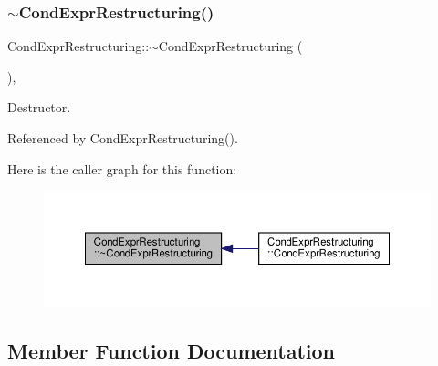 \subsubsection{\texorpdfstring{$\sim$\+Cond\+Expr\+Restructuring()}{~CondExprRestructuring()}}
{\footnotesize\ttfamily Cond\+Expr\+Restructuring\+::$\sim$\+Cond\+Expr\+Restructuring (\begin{DoxyParamCaption}{ }\end{DoxyParamCaption})\hspace{0.3cm}{\ttfamily [override]}, {\ttfamily [default]}}



Destructor. 



Referenced by Cond\+Expr\+Restructuring().

Here is the caller graph for this function\+:
\nopagebreak
\begin{figure}[H]
\begin{center}
\leavevmode
\includegraphics[width=350pt]{dd/d33/classCondExprRestructuring_a0757aa268f6cc71b9b5966ac6ce38ab0_icgraph}
\end{center}
\end{figure}


\subsection{Member Function Documentation}
\mbox{\label{classCondExprRestructuring_a837db1066d7025261bde7b43ae4c7f86}} 
